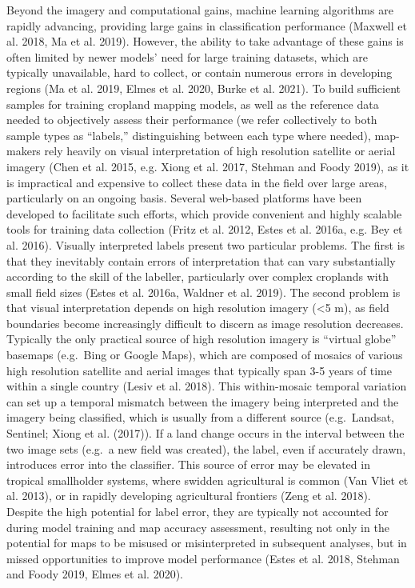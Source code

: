 \documentclass[11pt,a4paper]{article}
\begin{document}
Beyond the imagery and computational gains, machine learning algorithms
are rapidly advancing, providing large gains in classification
performance (Maxwell et al. 2018, Ma et al. 2019). However, the ability
to take advantage of these gains is often limited by newer models' need
for large training datasets, which are typically unavailable, hard to
collect, or contain numerous errors in developing regions (Ma et al.
2019, Elmes et al. 2020, Burke et al. 2021). To build sufficient samples
for training cropland mapping models, as well as the reference data
needed to objectively assess their performance (we refer collectively to
both sample types as ``labels,'' distinguishing between each type where
needed), map-makers rely heavily on visual interpretation of high
resolution satellite or aerial imagery (Chen et al. 2015, e.g. Xiong et
al. 2017, Stehman and Foody 2019), as it is impractical and expensive to
collect these data in the field over large areas, particularly on an
ongoing basis. Several web-based platforms have been developed to
facilitate such efforts, which provide convenient and highly scalable
tools for training data collection (Fritz et al. 2012, Estes et al.
2016a, e.g. Bey et al. 2016). Visually interpreted labels present two
particular problems. The first is that they inevitably contain errors of
interpretation that can vary substantially according to the skill of the
labeller, particularly over complex croplands with small field sizes
(Estes et al. 2016a, Waldner et al. 2019). The second problem is that
visual interpretation depends on high resolution imagery (\textless5 m),
as field boundaries become increasingly difficult to discern as image
resolution decreases. Typically the only practical source of high
resolution imagery is ``virtual globe'' basemaps (e.g.~Bing or Google
Maps), which are composed of mosaics of various high resolution
satellite and aerial images that typically span 3-5 years of time within
a single country (Lesiv et al. 2018). This within-mosaic temporal
variation can set up a temporal mismatch between the imagery being
interpreted and the imagery being classified, which is usually from a
different source (e.g.~Landsat, Sentinel; Xiong et al. (2017)). If a
land change occurs in the interval between the two image sets (e.g.~a
new field was created), the label, even if accurately drawn, introduces
error into the classifier. This source of error may be elevated in
tropical smallholder systems, where swidden agricultural is common (Van
Vliet et al. 2013), or in rapidly developing agricultural frontiers
(Zeng et al. 2018). Despite the high potential for label error, they are
typically not accounted for during model training and map accuracy
assessment, resulting not only in the potential for maps to be misused
or misinterpreted in subsequent analyses, but in missed opportunities to
improve model performance (Estes et al. 2018, Stehman and Foody 2019,
Elmes et al. 2020).
\end{document}
